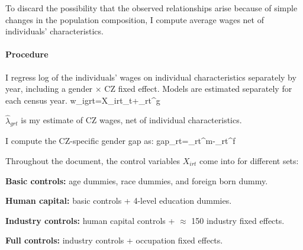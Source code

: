 To discard the possibility that the observed relationships arise because of simple changes in the population composition, I compute average wages net of individuals' characteristics.

\paragraph{Procedure}
\benu
	\item I regress log of the individuals' wages on individual characteristics separately by year, including a gender $\times$ CZ fixed effect. Models are estimated separately for each census year.
	\beqns
		w_{igrt}=X_{irt}\gamma_t+\lambda_{rt}^g
	\eeqns
	\item $\hat{\lambda}_{grt}$ is my estimate of CZ wages, net of individual characteristics.
	\item I compute the CZ-specific gender gap as:
	\beqns
		gap_{rt}=\hat{\lambda}_{rt}^m-\hat{\lambda}_{rt}^f
	\eeqns
\eenu

Throughout the document, the control variables $X_{irt}$ come into for different sets:
\bitem
	\item \textbf{Basic controls:} age dummies, race dummies, and foreign born dummy.
	\item \textbf{Human capital:} basic controls + 4-level education dummies.
	\item \textbf{Industry controls:} human capital controls + $\approx$ 150 industry fixed effects.
	\item \textbf{Full controls:} industry controls + occupation fixed effects.
\eitem